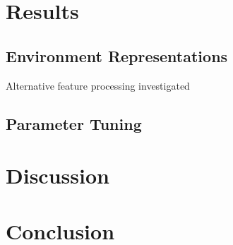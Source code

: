 \documentclass[11pt]{article}
\begin{document}
\begin{multicols}{2}
%
%
%
%
%




\section{Results}


\subsection{Environment Representations}

Alternative feature processing investigated



\subsection{Parameter Tuning}

%
%
%






\section{Discussion}








\section{Conclusion}












\end{multicols}
\end{document}

